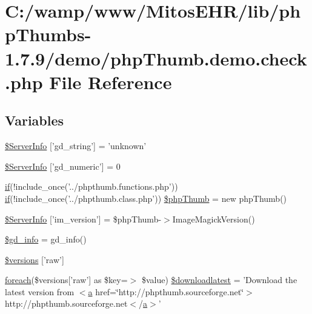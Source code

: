 \hypertarget{php_thumb_8demo_8check_8php}{\section{\-C\-:/wamp/www/\-Mitos\-E\-H\-R/lib/php\-Thumbs-\/1.7.9/demo/php\-Thumb.demo.\-check.\-php \-File \-Reference}
\label{php_thumb_8demo_8check_8php}
}
\subsection*{\-Variables}
\begin{DoxyCompactItemize}
\item 
\hyperlink{php_thumb_8demo_8check_8php_a9fc19f5767062100c17dfcd62a18cf40}{\$\-Server\-Info} \mbox{[}'gd\-\_\-string'\mbox{]} = 'unknown'
\item 
\hyperlink{php_thumb_8demo_8check_8php_ab117303405551f61aec5f0c7e18bd881}{\$\-Server\-Info} \mbox{[}'gd\-\_\-numeric'\mbox{]} = 0
\item 
\hyperlink{_setup_8inc_8php_ad0184337b31d13763ec8751feff4aabe}{if}(!include\-\_\-once('../phpthumb.\-functions.\-php')) \*
\hyperlink{_setup_8inc_8php_ad0184337b31d13763ec8751feff4aabe}{if}(!include\-\_\-once('../phpthumb.\-class.\-php')) \hyperlink{php_thumb_8demo_8check_8php_aa255ed2e2f11993a251707f14a754498}{\$php\-Thumb} = new php\-Thumb()
\item 
\hyperlink{php_thumb_8demo_8check_8php_ad1f321ab5b4c67d74022713a2273b02c}{\$\-Server\-Info} \mbox{[}'im\-\_\-version'\mbox{]} = \$php\-Thumb-\/$>$\-Image\-Magick\-Version()
\item 
\hyperlink{php_thumb_8demo_8check_8php_af2c7b7086347d2db2cbba6ff28df96e7}{\$gd\-\_\-info} = gd\-\_\-info()
\item 
\hyperlink{php_thumb_8demo_8check_8php_a472d5d8f14cb6f160bae44d85d968e10}{\$versions} \mbox{[}'raw'\mbox{]}
\item 
\hyperlink{php_thumb_8demo_8demo_8php_a9caa026f841c5a6057418795d37e0ef9}{foreach}(\$versions\mbox{[}'raw'\mbox{]} as \*
\$key=$>$ \$value) \hyperlink{php_thumb_8demo_8check_8php_a2007a2042e35b0571aa4108c9068e8a9}{\$downloadlatest} = '\-Download the latest version from $<$\hyperlink{classa}{a} href=\char`\"{}http\-://phpthumb.\-sourceforge.\-net\char`\"{}$>$http\-://phpthumb.\-sourceforge.\-net$<$/\hyperlink{classa}{a}$>$'
\item 

\end{DoxyCompactItemize}

